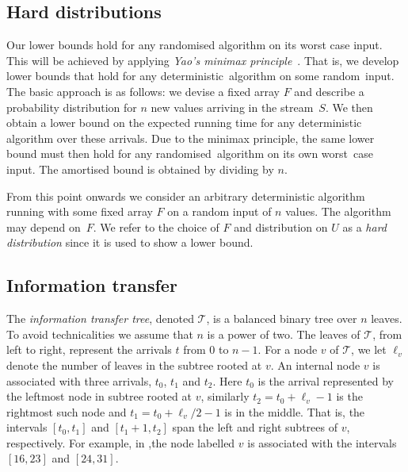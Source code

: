 \documentclass{toc}
\newcommand{\calT}{\ensuremath{\mathcal{T}}}
\begin{document}
%

\subsection{Hard distributions}

Our lower bounds hold for any randomised algorithm on its worst case
input. This will be achieved by applying \emph{Yao's
	minimax principle}~\cite{Yao1977:Minimax}. That is, we develop
lower bounds that
hold for any deterministic~algorithm on some random~input. The basic approach is as follows: we devise a fixed array $F$ and describe a probability
distribution for $n$ new values arriving in the stream~$S$.
We then obtain a lower bound on the expected
running time for any deterministic algorithm over these arrivals.
Due to the minimax principle, the
same lower bound must then hold for any randomised~algorithm on its own
worst~case input. The amortised bound is obtained by dividing by $n$.

{}From this point onwards we consider an arbitrary deterministic algorithm
running with some fixed array $F$ on a random input of $n$ values. The algorithm may depend on~$F$. We refer to the choice of $F$ and distribution on $U$ as a \emph{hard distribution} since it is used to show a lower bound.

%
%




\subsection{Information transfer} \label{sec:more-notation}

The \emph{information transfer tree}, denoted $\calT$, is a balanced
binary tree over $n$ leaves. To avoid technicalities we assume that
$n$ is a power of two.
The leaves
of $\calT$, from left to right, represent the arrivals $t$ from $0$
to $n-1$.
For a node $v$ of $\calT$, we let $\ell_{v}$
denote the number of leaves in the subtree rooted at $v$. 
An internal node $v$ is associated with three arrivals,
$t_{0}$, $t_{1}$ and $t_{2}$. Here $t_{0}$ is the arrival represented
by the leftmost node in subtree rooted at $v$, similarly $t_{2}=t_{0}+\ell_{v}-1$ is the rightmost such node and $t_{1}=t_{0}+\ell_{v}/2-1$ is in the middle. That is, the intervals $[t_{0},t_{1}]$
and $[t_{1}+1,t_{2}]$ span the left and right subtrees of $v$, respectively.
For example, in ,\inserttreefigure the node labelled $v$ is associated with the intervals $[16,23]$ and $[24,31]$.
\end{document}

